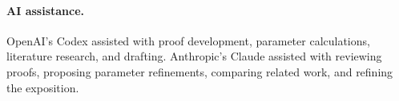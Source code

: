 \documentclass[11pt]{article}
\theoremstyle{definition}
\newcommand{\1}{\mathbf 1}
\begin{document}
\paragraph{AI assistance.}
OpenAI's Codex assisted with proof development, parameter calculations,
literature research, and drafting. Anthropic's Claude assisted with
reviewing proofs, proposing parameter refinements, comparing related
work, and refining the exposition.



\end{document}
